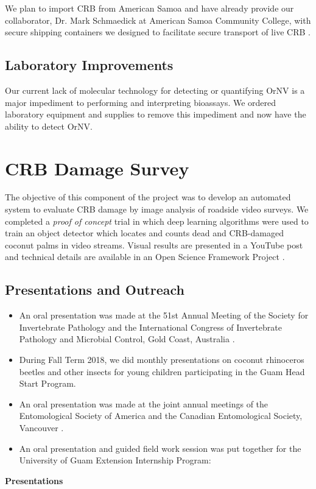 \documentclass[12pt,letterpaper,english,bibliography=totocnumbered]{scrartcl}
\begin{document}
We plan to import CRB from American Samoa and have already provide our collaborator, Dr. Mark Schmaedick at American Samoa Community College, with secure shipping containers we designed to facilitate secure transport of live CRB \cite{moore_container_2017-1}.

\subsection{Laboratory Improvements}

Our current lack of molecular technology for detecting or quantifying OrNV is a major impediment to performing and interpreting bioassays. We ordered laboratory equipment and supplies to remove this impediment and now have the ability to detect OrNV. 


\section{CRB Damage Survey}

The objective of this component of the project was to develop an automated system to evaluate CRB damage by image analysis of roadside video surveys.  We completed a \textit{proof of concept} trial in which deep learning algorithms were used to train an object detector which locates and counts dead and CRB-damaged coconut palms in video streams.  Visual results are presented in a YouTube post \cite{moore_training_2019} and technical details are available in an Open Science Framework Project \cite{moore_open_2019}.

\begin{refsection}
\section{Presentations and Outreach}

\begin{itemize}
	
	\item An oral presentation was made at the 51st Annual Meeting of the Society for Invertebrate Pathology and the International Congress of Invertebrate Pathology and Microbial Control, Gold Coast, Australia \cite{moore_attempted_2018-1}.
		
	\item During Fall Term 2018, we did monthly presentations on coconut rhinoceros beetles and other insects for young children participating in the Guam Head Start Program.
	
	\item An oral presentation was made at the joint annual meetings of the Entomological Society of America and the Canadian Entomological Society, Vancouver \cite{moore_failed_2018-1}.
	
	\item An oral presentation and guided field work session was put together for the University of Guam Extension Internship Program: \cite{moore_coconut_2019-2}
		
\end{itemize}

\textbf{Presentations}

	\printbibliography[heading=none]
\end{refsection}
\end{document}
